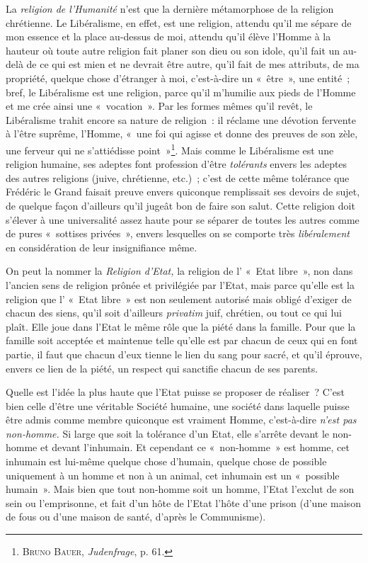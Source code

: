 \documentclass[french,twoside]{book} %
\begin{document}
La \emph{religion de l’Humanité} n’est que la dernière métamorphose de la religion chrétienne. Le Libéralisme, en effet, est une religion, attendu qu’il me sépare de mon essence et la place au-dessus de moi, attendu qu’il élève l’Homme à la hauteur où toute autre religion fait planer son dieu ou son idole, qu’il fait un au-delà de ce qui est mien et ne devrait être autre, qu’il fait de mes attributs, de ma propriété, quelque chose d’étranger à moi, c’est-à-dire un « être », une entité ; bref, le Libéralisme est une religion, parce qu’il m’humilie aux pieds de l’Homme et me crée ainsi une « vocation ». Par les formes mêmes qu’il revêt, le Libéralisme trahit encore sa nature de religion : il réclame une dévotion fervente à l’être suprême, l’Homme, « une foi qui agisse et donne des preuves de son zèle, une ferveur qui ne s’attiédisse point »\footnote{ \noindent B{\scshape runo} B{\scshape auer}, \emph{Judenfrage}, p. 61.
 }. Mais comme le Libéralisme est une religion humaine, ses adeptes font profession d’être \emph{tolérants} envers les adeptes des autres religions (juive, chrétienne, etc.) ; c’est de cette même tolérance que Frédéric le Grand faisait preuve envers quiconque remplissait ses devoirs de sujet, de quelque façon d’ailleurs qu’il jugeât bon de faire son salut. Cette religion doit s’élever à une universalité assez haute pour se séparer de toutes les autres comme de pures « sottises privées »,  envers lesquelles on se comporte très \emph{libéralement} en considération de leur insignifiance même.\par
On peut la nommer la \emph{Religion d’Etat,} la religion de l’ « Etat libre », non dans l’ancien sens de religion prônée et privilégiée par l’Etat, mais parce qu’elle est la religion que l’ « Etat libre » est non seulement autorisé mais obligé d’exiger de chacun des siens, qu’il soit d’ailleurs \emph{privatim} juif, chrétien, ou tout ce qui lui plaît. Elle joue dans l’Etat le même rôle que la piété dans la famille. Pour que la famille soit acceptée et maintenue telle qu’elle est par chacun de ceux qui en font partie, il faut que chacun d’eux tienne le lien du sang pour sacré, et qu’il éprouve, envers ce lien de la piété, un respect qui sanctifie chacun de ses parents.\par
Quelle est l’idée la plus haute que l’Etat puisse se proposer de réaliser ? C’est bien celle d’être une véritable Société humaine, une société dans laquelle puisse être admis comme membre quiconque est vraiment Homme, c’est-à-dire \emph{n’est pas non-homme. }Si large que soit la tolérance d’un Etat, elle s’arrête devant le non-homme et devant l’inhumain. Et cependant ce « non-homme » est homme, cet inhumain est lui-même quelque chose d’humain, quelque chose de possible uniquement à un homme et non à un animal, cet inhumain est un « possible humain ». Mais bien que tout non-homme soit un homme, l’Etat l’exclut de son sein ou l’emprisonne, et fait d’un hôte de l’Etat l’hôte d’une prison (d’une maison de fous ou d’une maison de santé, d’après le Communisme).\par
\end{document}
